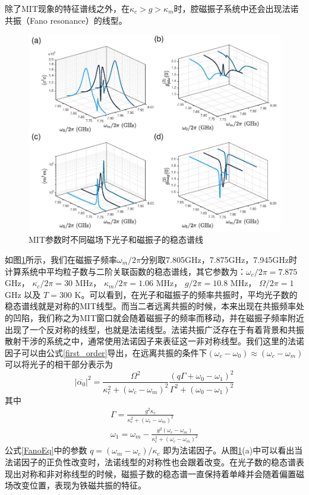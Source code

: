 除了MIT现象的特征谱线之外，在$\kappa_c>g>\kappa_m$时，腔磁振子系统中还会出现法诺共振（Fano resonance）的线型。
\begin{figure}[htbp]
	\centering
	\includegraphics[width=2\basefigurewidth,clip]{./figure/4_6}
	\caption{MIT参数时不同磁场下光子和磁振子的稳态谱线} 
	\label{MITOmVary}
\end{figure}
如图\ref{MITOmVary}所示，我们在磁振子频率$\omega_m/2\pi$分别取7.805GHz，7.875GHz，7.945GHz时计算系统中平均粒子数与二阶关联函数的稳态谱线，其它参数为：$\omega_c/2\pi=7.875$ GHz， $\kappa_c/2\pi=30$ MHz， $\kappa_m/2\pi=1.06$ MHz， $g/2\pi=10.8$ MHz， $\Omega/2\pi=1$ GHz 以及 $T=300$ K。可以看到，在光子和磁振子的频率共振时，平均光子数的稳态谱线就是对称的MIT线型。而当二者远离共振的时候，本来出现在共振频率处的凹陷，我们称之为MIT窗口就会随着磁振子的频率而移动，并在磁振子频率附近出现了一个反对称的线型，也就是法诺线型。法诺共振广泛存在于有着背景和共振散射干涉的系统之中，通常使用法诺因子来表征这一非对称线型。我们这里的法诺因子可以由公式\eqref{first_order}导出，在远离共振的条件下$(\omega_c-\omega_0)\approx(\omega_c-\omega_m)$可以将光子的相干部分表示为
\begin{equation}
|\overline{\alpha_{0}}|^{2} =\frac{\Omega^{2}}{\kappa_{c}^{2}+(\omega_{c}-\omega_{m})^{2}}\frac{(q\Gamma+\omega_{0}-\omega_{1})^{2}}{\Gamma^{2}+(\omega_{0}-\omega_{1})^{2}}
\label{FanoEq}
\end{equation}
其中
\begin{gather}
\Gamma=\frac{g^{2}\kappa_{c}}{\kappa_{c}^{2}+(\omega_{c}-\omega_{m})^{2}} \\
\omega_{1}=\omega_{m}-\frac{g^{2}(\omega_{c}-\omega_{m})}{\kappa_{c}^{2}+(\omega_{c}-\omega_{m})^{2}}
\end{gather}
公式\eqref{FanoEq}中的参数 $q=(\omega_{m}-\omega_{c})/\kappa_c$ 即为法诺因子。从图\ref{MITOmVary}(a)中可以看出当法诺因子的正负性改变时，法诺线型的对称性也会跟着改变。在光子数的稳态谱表现出对称和非对称线型的时候，磁振子数的稳态谱一直保持着单峰并会随着偏置磁场改变位置，表现为铁磁共振的特征。

